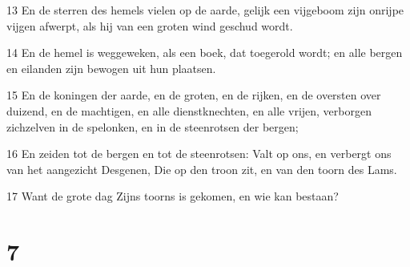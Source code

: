 \par 13 En de sterren des hemels vielen op de aarde, gelijk een vijgeboom zijn onrijpe vijgen afwerpt, als hij van een groten wind geschud wordt.
\par 14 En de hemel is weggeweken, als een boek, dat toegerold wordt; en alle bergen en eilanden zijn bewogen uit hun plaatsen.
\par 15 En de koningen der aarde, en de groten, en de rijken, en de oversten over duizend, en de machtigen, en alle dienstknechten, en alle vrijen, verborgen zichzelven in de spelonken, en in de steenrotsen der bergen;
\par 16 En zeiden tot de bergen en tot de steenrotsen: Valt op ons, en verbergt ons van het aangezicht Desgenen, Die op den troon zit, en van den toorn des Lams.
\par 17 Want de grote dag Zijns toorns is gekomen, en wie kan bestaan?

\chapter{7}

